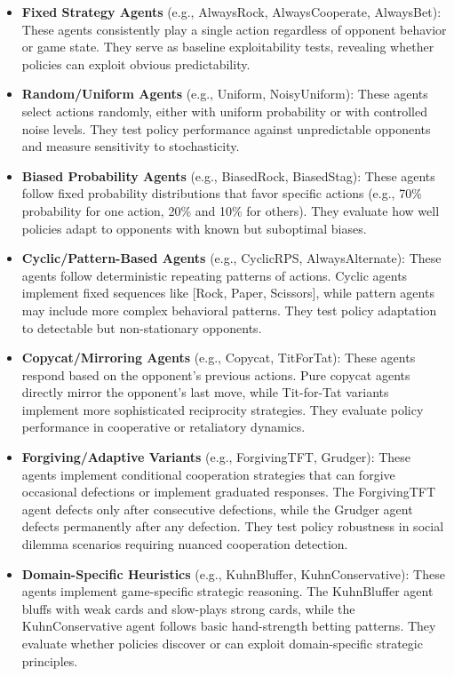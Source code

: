 \documentclass[sigconf,anonymous]{aamas}
\begin{document}
\begin{itemize}
    \item \textbf{Fixed Strategy Agents} (e.g., AlwaysRock, AlwaysCooperate, AlwaysBet): These agents consistently play a single action regardless of opponent behavior or game state. They serve as baseline exploitability tests, revealing whether policies can exploit obvious predictability.
    
    \item \textbf{Random/Uniform Agents} (e.g., Uniform, NoisyUniform): These agents select actions randomly, either with uniform probability or with controlled noise levels. They test policy performance against unpredictable opponents and measure sensitivity to stochasticity.
    
    \item \textbf{Biased Probability Agents} (e.g., BiasedRock, BiasedStag): These agents follow fixed probability distributions that favor specific actions (e.g., 70\% probability for one action, 20\% and 10\% for others). They evaluate how well policies adapt to opponents with known but suboptimal biases.
    
    \item \textbf{Cyclic/Pattern-Based Agents} (e.g., CyclicRPS, AlwaysAlternate): These agents follow deterministic repeating patterns of actions. Cyclic agents implement fixed sequences like [Rock, Paper, Scissors], while pattern agents may include more complex behavioral patterns. They test policy adaptation to detectable but non-stationary opponents.
    
    \item \textbf{Copycat/Mirroring Agents} (e.g., Copycat, TitForTat): These agents respond based on the opponent's previous actions. Pure copycat agents directly mirror the opponent's last move, while Tit-for-Tat variants implement more sophisticated reciprocity strategies. They evaluate policy performance in cooperative or retaliatory dynamics.
    
    \item \textbf{Forgiving/Adaptive Variants} (e.g., ForgivingTFT, Grudger): These agents implement conditional cooperation strategies that can forgive occasional defections or implement graduated responses. The ForgivingTFT agent defects only after consecutive defections, while the Grudger agent defects permanently after any defection. They test policy robustness in social dilemma scenarios requiring nuanced cooperation detection.
    
    \item \textbf{Domain-Specific Heuristics} (e.g., KuhnBluffer, KuhnConservative): These agents implement game-specific strategic reasoning. The KuhnBluffer agent bluffs with weak cards and slow-plays strong cards, while the KuhnConservative agent follows basic hand-strength betting patterns. They evaluate whether policies discover or can exploit domain-specific strategic principles.
\end{itemize}
\end{document}
